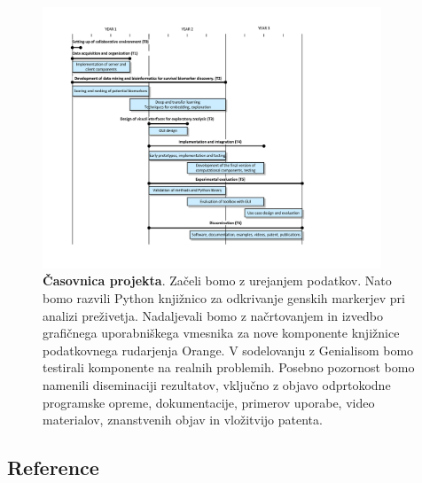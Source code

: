 \documentclass[11pt,a4paper]{article}
\renewcommand{\bold}{\textbf}
\begin{document}
\begin{figure}
\includegraphics[width=0.90\textwidth]{gantt}
\caption{\small\bold{Časovnica projekta}. Začeli bomo z urejanjem podatkov. Nato bomo razvili Python knjižnico za odkrivanje genskih markerjev pri analizi preživetja. Nadaljevali bomo z načrtovanjem in izvedbo grafičnega uporabniškega vmesnika za nove komponente knjižnice podatkovnega rudarjenja Orange. V sodelovanju z Genialisom bomo testirali komponente na realnih problemih. Posebno pozornost bomo namenili  diseminaciji rezultatov, vključno z objavo odprtokodne programske opreme, dokumentacije, primerov uporabe, video materialov, znanstvenih objav in vložitvijo patenta.}
\label{fig:gantt}
\end{figure}

\subsection*{Reference}


\begin{multicols}{2}
\footnotesize
\setlength{\parskip}{0em}
\renewcommand{\baselinestretch}{1.0}


\end{multicols}
\end{document}
